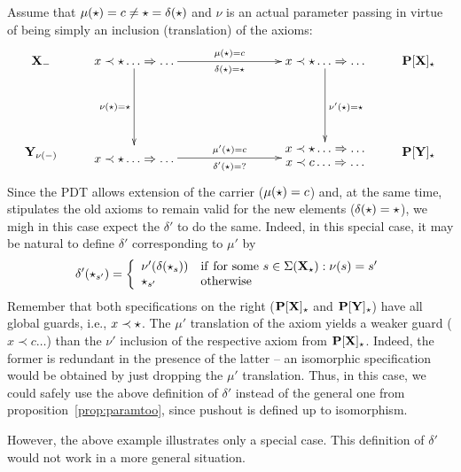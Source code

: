 \begin{example}\label{ex:deltapr}
Assume that $\mu(\star)=c\not=\star=\delta(\star)$ and
$\nu$ is an actual parameter passing in virtue of being simply an
inclusion (translation) of the axioms:
\[ \xymatrix{
\thr{X_\weak} & x\prec \cons\ldots\To\ldots \ar[rrr]^{\mu(\cons)=c}_{\delta(\cons)=\cons} \ar[dd]_{\nu(\cons)=\cons}
	&&& x\prec \cons\ldots\To\ldots \ar[dd]^{\nu'(\cons)=\cons} & \thr{P[X]_\cons}\\
	\\
\thr{Y_{\nu(\weak)}} & \txt{\ \\ $x\prec \cons\ldots\To\ldots$}
	\ar@<-1ex>[rrr]^{\mu'(\cons)=c}_{\delta'(\cons)=?}
	&&& \txt{$x\prec \cons\ldots\To\ldots$\\$x\prec c\ldots\To\ldots$} & \thr{P[Y]_\cons}
}
\]
Since the PDT allows extension of the carrier ($\mu(\star)=c$) and, at the
same time, stipulates the old axioms to remain valid for the new elements
($\delta(\star)=\star$), we migh in this case expect the $\delta'$ to do the
same. Indeed, in this special case, it may be natural to define 
$\delta'$ corresponding to $\mu'$ by \[\delta'(\cons_{s'}) =
\left\{\begin{array}{ll} {\nu'}(\delta(\cons_{s})) & {\rm if\ for\ some\
}s\in\Sigma(\thr{X_\cons}):\nu(s)=s' \\ \cons_{s'} & {\rm otherwise}
\end{array}\right.
\]
Remember that both specifications on the right (${\bf P[X]_{\star}}$ and
${\bf P[Y]_\star}$) have all global guards, i.e., $x\prec \star$. 
The $\mu'$ translation of the axiom yields a weaker guard ($x\prec c\ldots$) than
the $\nu'$ inclusion of the respective axiom from ${\bf P[X]_\star}$. Indeed, the
former is redundant in the presence of the latter -- an isomorphic
specification would be obtained by just dropping the $\mu'$ translation.
Thus, in this case, we could safely use the above definition of $\delta'$
instead of the general one from proposition~\ref{prop:paramtoo}, since pushout is
defined up to isomorphism.
\end{example}
However, the above example illustrates only a special case. This definition of
$\delta'$ would not work in a more general situation.
